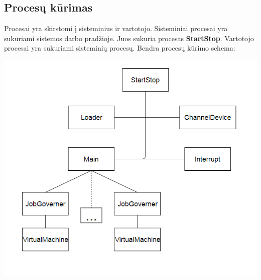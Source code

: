 \documentclass{scrartcl}
\begin{document}
      \subsection{Procesų kūrimas}
      Procesai yra skirstomi į sisteminius ir vartotojo. Sisteminiai procesai yra sukuriami sistemos darbo pradžioje. Juos sukuria procesas \textbf{StartStop}. Vartotojo procesai yra sukuriami sisteminių procesų. Bendra procesų kūrimo schema:
      \begin{center}
        \includegraphics[scale=0.65]{Process_creation}
      \end{center}
\end{document}
